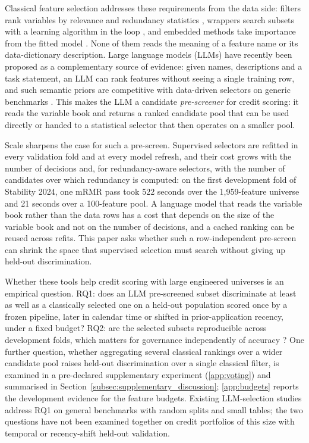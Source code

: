 \documentclass[final,5p,twocolumn]{elsarticle}
\providecommand{\DIFaddtex}[1]{{\protect\color{blue} \sf #1}} %
\providecommand{\DIFaddbegin}{} %
\providecommand{\DIFaddend}{} %
\providecommand{\DIFadd}[1]{\texorpdfstring{\DIFaddtex{#1}}{#1}} %
\begin{document}
Classical feature selection addresses these requirements from the data side: filters rank variables by relevance and redundancy statistics \cite{guyon2003,peng2005}, wrappers search subsets with a learning algorithm in the loop \cite{kohavi1997,guyon2002,kursa2010}, and embedded methods take importance from the fitted model \cite{tibshirani1996,lundberg2017}. None of them reads the meaning of a feature name or its data-dictionary description. Large language models (LLMs) have recently been proposed as a complementary source of evidence: given names, descriptions and a task statement, an LLM can rank features without seeing a single training row, and such semantic priors are competitive with data-driven selectors on generic benchmarks \cite{choi2022,jeong2025,li2025sigkdd,zhang2025llmlasso}. This makes the LLM a candidate \emph{pre-screener} for credit scoring: it reads the variable book and returns a ranked candidate pool that can be used directly or handed to a statistical selector that then operates on a smaller pool.

\DIFaddbegin \DIFadd{Scale sharpens the case for such a pre-screen. Supervised selectors are refitted in every validation fold and at every model refresh, and their cost grows with the number of decisions and, for redundancy-aware selectors, with the number of candidates over which redundancy is computed: on the first development fold of Stability 2024, one mRMR pass took 522 seconds over the 1,959-feature universe and 21 seconds over a 100-feature pool. A language model that reads the variable book rather than the data rows has a cost that depends on the size of the variable book and not on the number of decisions, and a cached ranking can be reused across refits. This paper asks whether such a row-independent pre-screen can shrink the space that supervised selection must search without giving up held-out discrimination.
}

\DIFaddend Whether these tools help credit scoring with large engineered universes is an empirical question. RQ1: does an LLM pre-screened subset discriminate at least as well as a classically selected one on a held-out population scored once by a frozen pipeline, later in calendar time or shifted in prior-application recency, under a fixed budget? RQ2: are the selected subsets reproducible across development folds, which matters for governance independently of accuracy \cite{kalousis2007,nogueira2018}? One further question, whether aggregating several classical rankings over a wider candidate pool raises held-out discrimination over a single classical filter, is examined in a pre-declared supplementary experiment (\ref{app:voting}) and summarised in Section~\ref{subsec:supplementary_discussion}; \ref{app:budgets} reports the development evidence for the feature budgets. Existing LLM-selection studies address RQ1 on general benchmarks with random splits and small tables; the two questions have not been examined together on credit portfolios of this size with temporal or recency-shift held-out validation.
\end{document}

